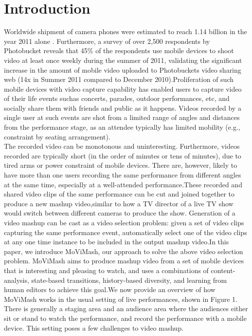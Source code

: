 \documentclass{IEEEtran}
\begin{document}
\section{Introduction}
Worldwide shipment of camera phones were estimated to reach 1.14 billion in the year 2011 alone \cite{web:1}. Furthermore, a survey of over 2,500 respondents by Photobucket reveals that 45\% of the \cite{web:2} respondents use mobile devices to shoot video at least once weekly during the summer of 2011, validating the significant increase in the amount of mobile video uploaded to Photobucket\textquotesingle s video sharing web (14x in Summer 2011 compared to December 2010)\cite{web:3}.Proliferation of such mobile devices with video capture capability has enabled users to capture video of their life events suchas concerts, parades, outdoor performances, etc, and socially share them with friends and public as it happens. Videos recorded by a single user at such events are shot from a limited range of angles and distances from the performance stage, as an attendee typically has limited mobility (e.g., constraint by seating arrangement).\\
\qquad  The recorded video can be monotonous and uninteresting. Furthermore, videos recorded are typically short (in the order of minutes or tens of minutes), due to tired arms or power constraint of mobile devices. There are, however, likely to have more than one users
recording the same performance from different angles at the same time, especially at a well-attended performance.These recorded and shared video clips of the same performance
can be cut and joined together to produce a new mashup video,similar to how a TV director of a live TV show would switch between different cameras to produce the show. Generation of a video
mashup can be cast as a video selection problem: given a set of video clips capturing the same performance event, automatically select one of the video clips at any one time instance to be included in the output mashup video.In this paper, we introduce MoViMash, our approach to solve the above video selection problem. MoViMash aims to produce mashup video from a set of mobile devices that is interesting and pleasing to watch, and uses a combinations of content-analysis, state-based transitions, history-based diversity, and learning from
human editors to achieve this goal.We now provide an overview of how MoViMash works in the
usual setting of live performances, shown in Figure 1. There is generally a staging area and an audience area where the audiences either sit or stand to watch the performance, and record the performance with a mobile device. This setting poses a few challenges to video mashup.
\end{document}
